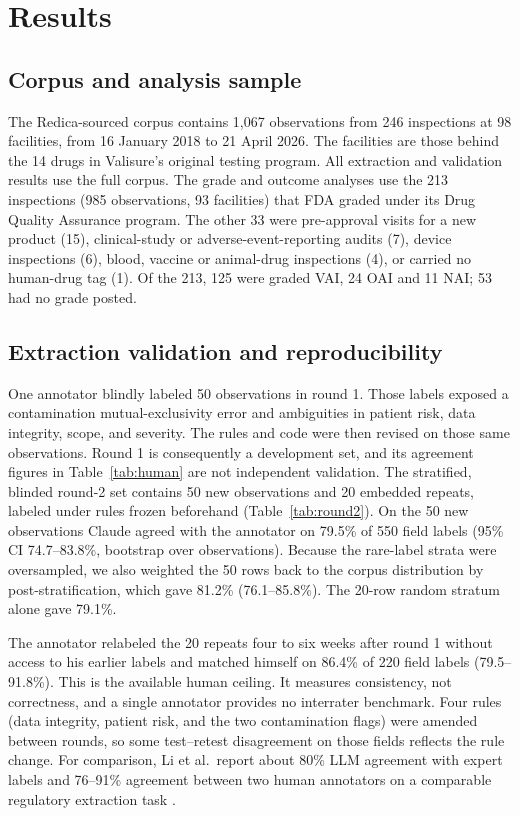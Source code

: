 \documentclass[12pt]{article}
\begin{document}
\section{Results}
\label{sec:results}

\subsection{Corpus and analysis sample}

The Redica-sourced corpus contains 1,067 observations from 246 inspections
at 98 facilities, from 16 January 2018 to 21 April 2026. The facilities are
those behind the 14 drugs in Valisure's original testing program. All
extraction and validation results use the full corpus. The grade and
outcome analyses use the 213 inspections (985 observations, 93 facilities)
that FDA graded under its Drug Quality Assurance program. The other 33 were
pre-approval visits for a new product (15), clinical-study or
adverse-event-reporting audits (7), device inspections (6), blood, vaccine
or animal-drug inspections (4), or carried no human-drug tag (1). Of the
213, 125 were graded VAI, 24 OAI and 11 NAI; 53 had no grade posted.

\subsection{Extraction validation and reproducibility}
\label{sec:validation}

One annotator blindly labeled 50 observations in round 1. Those labels
exposed a contamination mutual-exclusivity error and ambiguities in patient
risk, data integrity, scope, and severity. The rules and code were then
revised on those same observations. Round 1 is consequently a development
set, and its agreement figures in Table~\ref{tab:human} are not independent
validation. The stratified, blinded round-2 set contains 50 new observations
and 20 embedded repeats, labeled under rules frozen beforehand
(Table~\ref{tab:round2}). On the 50 new observations Claude agreed with
the annotator on 79.5\% of 550 field labels (95\% CI 74.7--83.8\%,
bootstrap over observations). Because the rare-label strata were
oversampled, we also weighted the 50 rows back to the corpus distribution
by post-stratification, which gave 81.2\% (76.1--85.8\%). The 20-row
random stratum alone gave 79.1\%.

The annotator relabeled the 20 repeats four to six weeks after round 1
without access to his earlier labels and matched himself on 86.4\% of 220
field labels (79.5--91.8\%). This is the available human ceiling. It
measures consistency, not correctness, and a single annotator provides no
interrater benchmark. Four rules (data integrity, patient risk, and the two
contamination flags) were amended between rounds, so some test--retest
disagreement on those fields reflects the rule change. For comparison,
Li et al.\ report about 80\% LLM agreement with expert labels and 76--91\%
agreement between two human annotators on a comparable regulatory
extraction task \citep{Li2026LLMDevice}.
\end{document}
